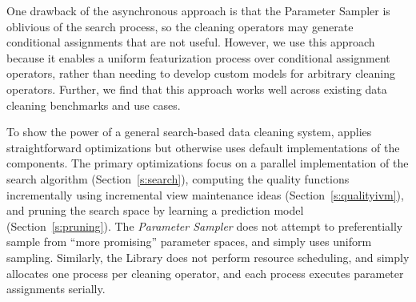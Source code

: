 One drawback of the asynchronous approach is that the Parameter Sampler is oblivious of the search process, so the cleaning operators may generate conditional assignments that are not useful.  However, we use this approach because it enables a uniform featurization process over conditional assignment operators, rather than needing to develop custom models for arbitrary cleaning operators.  Further, we find that this approach works well across existing data cleaning benchmarks and use cases.  

To show the power of a general search-based data cleaning system, \sys applies straightforward optimizations but otherwise uses default implementations of the components.  The primary optimizations focus on a parallel implementation of the search algorithm (Section~\ref{s:search}), computing the quality functions incrementally using incremental view maintenance ideas (Section~\ref{s:qualityivm}), and pruning the search space by learning a prediction model (Section~\ref{s:pruning}).  The {\it Parameter Sampler} does not attempt to preferentially sample from ``more promising'' parameter spaces, and simply uses uniform sampling.  Similarly, the Library does not perform resource scheduling, and simply allocates one process per cleaning operator, and each process executes parameter assignments serially. 




